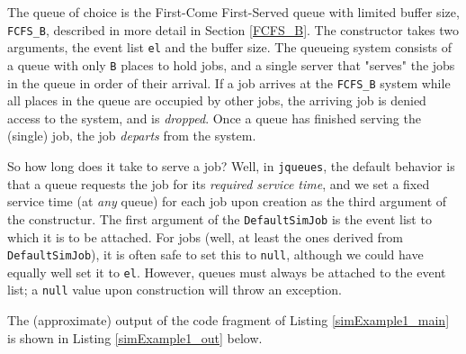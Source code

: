 \documentclass[12pt]{book}
\begin{document}
The queue of choice is the First-Come First-Served queue
  with limited buffer size, \lstinline|FCFS_B|,
  described in more detail in Section \ref{FCFS_B}.
The constructor takes two arguments,
  the event list \lstinline|el|
  and the buffer size.
The queueing system consists of a queue with only \lstinline|B|
  places to hold jobs,
  and a single server that "serves" the jobs in the queue in order
  of their arrival.
If a job arrives at the \lstinline|FCFS_B| system
  while all places in the queue are occupied by other jobs,
  the arriving job is denied access to the system,
  and is {\em dropped}.
Once a queue has finished serving the (single) job,
  the job {\em departs\/} from the system.

So how long does it take to serve a job?
Well, in \lstinline|jqueues|,
  the default behavior is that
  a queue requests the job for its
  {\em required service time},
  and we set a fixed service time (at {\em any\/} queue)
  for each job upon creation as the third argument of the constructur.
The first argument of the \lstinline-DefaultSimJob-
  is the event list to which it is to be attached.
For jobs (well, at least the ones derived from \lstinline|DefaultSimJob|),
  it is often safe to set this to \lstinline|null|,
  although we could have equally well set it to \lstinline|el|.
However, queues must always be attached to the event list;
  a \lstinline|null| value upon construction will throw an exception.

The (approximate) output of the code fragment of Listing \ref{simExample1_main}
is shown in Listing \ref{simExample1_out} below.
\end{document}
